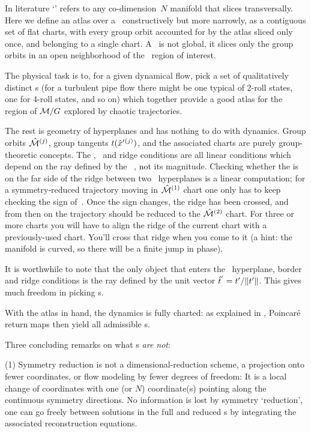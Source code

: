 In literature `\slice' refers to any
co-dimension~$N$ manifold that slices transversally. Here we define
an atlas over a \slice\ constructively but more narrowly, as a contiguous
set of flat charts, with every group orbit accounted for by the
atlas sliced only once, and belonging to a single chart. A \slice\ is not
global, it slices only the group orbits in an open neighborhood of the
\statesp\ region of interest.

The physical task is to, for a given dynamical flow, pick a set of
qualitatively distinct {\template s} (for a turbulent pipe
flow there might be one typical of 2-roll states, one for 4-roll states, and so on)
which together provide a good atlas for the region of ${\cal M}/G$
explored by chaotic trajectories.

The rest is geometry of hyperplanes and has nothing to do with dynamics.
Group orbits $\hat{\cal M}{}^{(j)}$, group tangents
$t({\hat{x}'}{}^{(j)})$, and the associated charts are purely
group-theoretic concepts. The \slice, \chartBord\ and ridge conditions
are all linear
conditions which depend on the ray defined by the \template\ \slicep, not
its magnitude. Checking whether the {\chartBord} is on the far side of
the ridge between two \slice\ hyperplanes is a linear computation; for a
symmetry-reduced trajectory moving in $\hat{\cal M}{}^{(1)}$ chart one only has
to keep checking the sign of
\beq
{}
\,.
Once the sign changes, the ridge has been crossed, and from then on
the trajectory should be reduced to the $\hat{\cal M}{}^{(2)}$ chart.
For three or more charts you will have to align the ridge of the current
chart with a previously-used chart. You'll cross that ridge when you come
to it (a hint: the manifold is curved, so there will be a finite jump in
phase).

It is worthwhile to note that the only object that enters the \slice\
hyperplane, border and ridge conditions is the ray defined by the unit
vector $\hat{t}{}^{'}= t'_{}/\|{t'_{}}\|$. This gives much
freedom in picking \template s.

With the atlas in hand, the dynamics is fully charted: as explained in
\refrefs{DasBuch,SiCvi10}, Poincar\'e return maps then yield all
admissible \rpo s.

Three concluding remarks on what \slice s \emph{are not}:

(1) Symmetry reduction is not a dimensional-reduction scheme, a
projection onto fewer coordinates, or flow modeling by fewer degrees of
freedom: It is a local change of coordinates with one (or $N$) coordinate(s)
pointing along the continuous symmetry directions. No information is lost
by symmetry `reduction', one can go freely between solutions in the full
and reduced \statesp s by integrating the associated {reconstruction
equations}.

